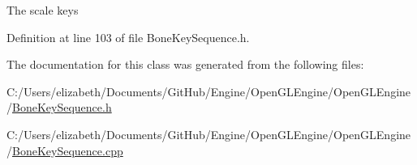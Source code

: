 The scale keys 



Definition at line 103 of file Bone\+Key\+Sequence.\+h.



The documentation for this class was generated from the following files\+:\begin{DoxyCompactItemize}
\item 
C\+:/\+Users/elizabeth/\+Documents/\+Git\+Hub/\+Engine/\+Open\+G\+L\+Engine/\+Open\+G\+L\+Engine/\hyperlink{_bone_key_sequence_8h}{Bone\+Key\+Sequence.\+h}\item 
C\+:/\+Users/elizabeth/\+Documents/\+Git\+Hub/\+Engine/\+Open\+G\+L\+Engine/\+Open\+G\+L\+Engine/\hyperlink{_bone_key_sequence_8cpp}{Bone\+Key\+Sequence.\+cpp}\end{DoxyCompactItemize}
